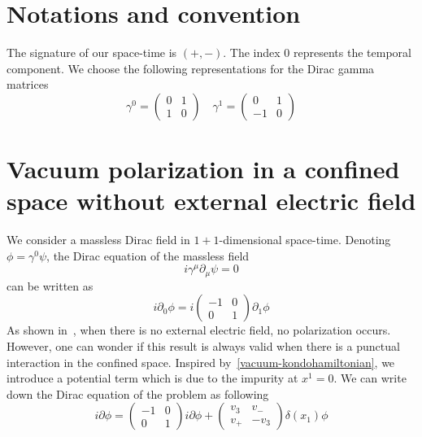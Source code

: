\section*{Notations and convention}
The signature of our space-time is $(+, -)$.
The index 0 represents the temporal component.
We choose the following representations for the Dirac gamma matrices
\begin{equation*}
\gamma^0 = \begin{pmatrix}
0 & 1 \\
1 & 0 \end{pmatrix}  \quad  \gamma^1 = \begin{pmatrix}
0  & 1 \\
-1 & 0
\end{pmatrix}
\end{equation*}
%
%
%
\section{Vacuum polarization in a confined space without external electric field}\label{sect-nef}
We consider a massless Dirac field in $1+1$-dimensional space-time. %
Denoting $\phi = \gamma^0\psi$, the Dirac equation of the massless field
\begin{equation*}
i\gamma^\mu\partial_\mu \psi = 0
\end{equation*}
can be written as
\begin{equation*}
i\partial_0\phi = i \begin{pmatrix} -1 & 0 \\ 0 & 1 \end{pmatrix}\partial_1\phi
\end{equation*}
As shown in~\cite{Zahn2015}, when there is no external electric field, no polarization occurs. 
However, one can wonder if this result is always valid when there is a punctual interaction in the confined space.
Inspired by~\cref{vacuum-kondohamiltonian}, we introduce a potential term which is due to the impurity at $x^1 = 0$.
We can write down the Dirac equation of the problem as following
\begin{equation}\label{nef-Dirac}
i \partial \phi = 
\begin{pmatrix} 
-1 & 0 \\
0 & 1 
\end{pmatrix} i \partial \phi +
\begin{pmatrix}
v_3 & v_- \\
v_+ & -v_3
\end{pmatrix} \delta(x_1) \phi
\end{equation}
